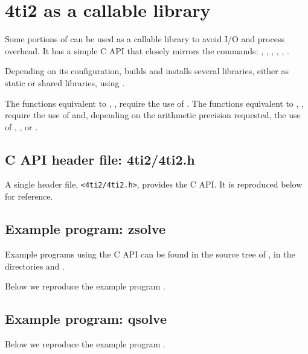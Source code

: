 \chapter{4ti2 as a callable library}


Some portions of \FourTiTwo{} can be used as a callable library to avoid I/O
and process overhead.  It has a simple C API that closely mirrors the 
commands: , , , ,
, .

Depending on its configuration, \FourTiTwo{} builds and installs several
libraries, either as static or shared libraries, using .

The functions equivalent to , , 
require the use of .
The functions equivalent to , , 
require the use of  and, depending on the arithmetic
precision requested, the use of ,
, or .

\section{C API header file: 4ti2/4ti2.h}

A single header file, \texttt{<4ti2/4ti2.h>}, provides the C API.  It is
reproduced below for reference.

{\scriptsize

}

\section{Example program: zsolve}

Example programs using the C API can be found in the source tree of
\FourTiTwo{}, in the directories  and
. 

Below we reproduce the example program . 

{\scriptsize

}

\section{Example program: qsolve}

Below we reproduce the example program . 

{\scriptsize

}



